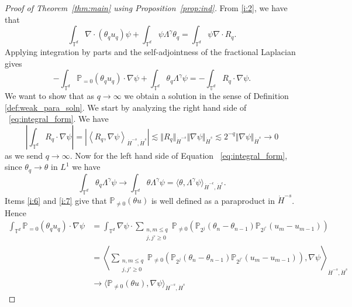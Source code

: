 \documentclass[10pt,a4paper]{amsart}
\newcommand{\T}{\mathbb T}
\begin{document}
\begin{proof}[Proof of Theorem~\ref{thm:main} using Proposition~\ref{prop:ind}]
From \ref{i:2}, we have that
$$
\int_{\T^d} \nabla \cdot (\theta_q u_q) \psi + \int_{\T^d} \psi \Lambda^\gamma \theta_q = \int_{\T^d} \psi \nabla \cdot R_q.
$$
Applying integration by parts and the self-adjointness of the fractional Laplacian gives
\begin{equation}\label{eq:integral_form}
    -\int_{\T^d} \mathbb{P}_{= 0}(\theta_q u_q) \cdot \nabla \psi + \int_{\T^d} \theta_q \Lambda^\gamma \psi = - \int_{\T^d} R_q \cdot \nabla \psi.
\end{equation}
We want to show that as $q \to \infty$ we obtain a solution in the sense of Definition \ref{def:weak_para_soln}. We start by analyzing the right hand side of ~\eqref{eq:integral_form}. We have
\begin{equation}\label{eq:stress_est}
    \left|\int_{\T^d} R_q \cdot \nabla \psi\right| = \left|\left\langle R_q, \nabla \psi\right\rangle_{\dot{H}^{-s},\dot{H}^s}\right| \lesssim \Vert R_q \Vert_{\dot{H}^{-s}} \Vert \nabla \psi \Vert_{\dot{H}^s} \lesssim 2^{-q} \Vert \nabla \psi \Vert_{\dot{H}^s} \to 0
\end{equation}
as we send $q \to \infty$. Now for the left hand side of Equation ~\eqref{eq:integral_form}, since $\theta_q \to \theta$ in $L^1$ we have
\begin{equation}\label{eq:L1_conv}
    \int_{\T^d} \theta_q \Lambda^\gamma \psi \to \int_{\T^d} \theta \Lambda^\gamma \psi = \langle \theta, \Lambda^\gamma \psi\rangle_{\dot{H}^{-\epsilon},\dot{H}^{\epsilon}}.
\end{equation}
Items \ref{i:6} and \ref{i:7} give that $\mathbb{P}_{\not=0}(\theta u)$ is well defined as a paraproduct in $\dot{H}^{-s}$. Hence
\begin{equation}\label{eq:nonlin_term}
    \begin{split}
        \int_{\T^d} \mathbb{P}_{= 0}(\theta_q u_q) \cdot \nabla \psi &= \int_{\T^d} \nabla \psi \cdot \sum_{\substack{n,m \leq q\\ j,j' \geq 0}} \mathbb{P}_{\not = 0}\left(\mathbb{P}_{2^j}(\theta_n - \theta_{n-1}) \mathbb{P}_{2^{j'}}(u_{m} - u_{m-1})\right)\\
        &= \left\langle \sum_{\substack{n,m \leq q\\ j,j' \geq 0}} \mathbb{P}_{\not = 0}\left(\mathbb{P}_{2^j}(\theta_n - \theta_{n-1}) \mathbb{P}_{2^{j'}}(u_{m} - u_{m-1})\right), \nabla \psi\right\rangle_{\dot{H}^{-s},\dot{H}^s}\\
        &\to \langle \mathbb{P}_{\not=0}(\theta u), \nabla \psi\rangle_{\dot{H}^{-s},\dot{H}^s}
    \end{split}

\end{equation}
\end{proof}
\end{document}
